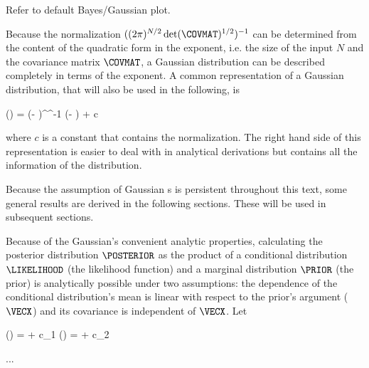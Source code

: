     Refer to default Bayes/Gaussian plot.

    Because the normalization $((2 \pi)^{N/2} \det(\COVMAT)^{1/2})^{-1}$ can
    be determined from the content of the quadratic form in the exponent,
    i.e. the size of the input $N$ and the covariance matrix $\COVMAT$, a
    Gaussian distribution can be described completely in terms of the exponent.
    A common representation of a Gaussian distribution, that will also be used
    in the following, is

     \ln(\GAUSS{\VECX}{\MEANVEC}{\COVMAT})
        = (\VECX - \MEANVEC)^\top \COVMAT^{-1} (\VECX - \MEANVEC) + c \EQCOMMA
    \stopformula

    where $c$ is a constant that contains the normalization. The right hand
    side of this representation is easier to deal with in analytical
    derivations but contains all the information of the distribution.

    Because the assumption of Gaussian {\PDF}s is persistent throughout this
    text, some general results are derived in the following sections. These
    will be used in subsequent sections.

    \startsubsection[title=Maximum Likelihood Estimators for the Parameters]

    \stopsubsection

    \startsubsection[title={Bayes' Theorem for Gaussians},reference=ret_bayes_gauss]

        Because of the Gaussian's convenient analytic properties, calculating
        the posterior distribution $\POSTERIOR$ as the product of a conditional
        distribution $\LIKELIHOOD$ (the likelihood function) and a marginal
        distribution $\PRIOR$ (the prior) is analytically possible under two
        assumptions: the dependence of the conditional distribution's mean is
        linear with respect to the prior's argument ($\VECX$) and its
        covariance is independent of $\VECX$. Let

        \startformula
        \startalign[n=2,align{right,left}]
             \ln(\LIKELIHOOD) = \NC \GAUSSEXP{\VECY}{\FWDJAC\VECX - \VECB}{\COVMATY} + c_1 \NR
             \ln(\PRIOR) = \NC \GAUSSEXP{\VECX}{\MEANVECA}{\COVMATX} + c_2 \NR
        \stopalign
        \stopformula

        ...

